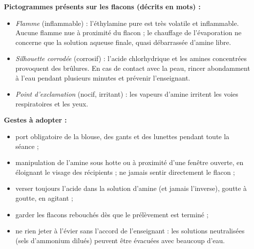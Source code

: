 \documentclass[11pt]{article}
\newcounter{popsec}
\newcounter{popsub}
\newcommand{\courssub}[1]{%
  \stepcounter{popsub}%
  \par\vspace{9pt}\noindent{\popxbold\fontsize{11.5}{13}\selectfont\color{popink}{\color{poporange}\thepopsec.\thepopsub}\hspace{6pt}#1}\par\nopagebreak\vspace{4pt}
}
\begin{document}
\begin{attention}
\textbf{Pictogrammes présents sur les flacons (décrits en mots) :}
\begin{itemize}
\item \emph{Flamme} (inflammable) : l'éthylamine pure est très volatile et inflammable. Aucune flamme nue à proximité du flacon ; le chauffage de l'évaporation ne concerne que la solution aqueuse finale, quasi débarrassée d'amine libre.
\item \emph{Silhouette corrodée} (corrosif) : l'acide chlorhydrique et les amines concentrées provoquent des brûlures. En cas de contact avec la peau, rincer abondamment à l'eau pendant plusieurs minutes et prévenir l'enseignant.
\item \emph{Point d'exclamation} (nocif, irritant) : les vapeurs d'amine irritent les voies respiratoires et les yeux.
\end{itemize}
\textbf{Gestes à adopter :}
\begin{itemize}
\item port obligatoire de la blouse, des gants et des lunettes pendant toute la séance ;
\item manipulation de l'amine sous hotte ou à proximité d'une fenêtre ouverte, en éloignant le visage des récipients ; ne jamais sentir directement le flacon ;
\item verser toujours l'acide dans la solution d'amine (et jamais l'inverse), goutte à goutte, en agitant ;
\item garder les flacons rebouchés dès que le prélèvement est terminé ;
\item ne rien jeter à l'évier sans l'accord de l'enseignant : les solutions neutralisées (sels d'ammonium dilués) peuvent être évacuées avec beaucoup d'eau.
\end{itemize}
\end{attention}

\courssub{Schéma du dispositif}
\end{document}
